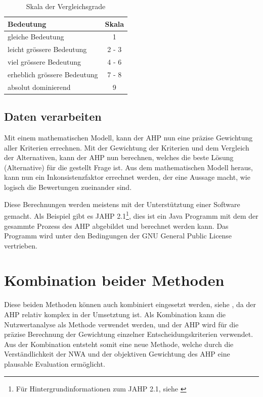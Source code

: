   \begin{table}[ht]
    \sffamily 
    \begin{center}
      \begin{tabular}{lc}
        \toprule
        Bedeutung & Skala\\
        \midrule
        gleiche Bedeutung & 1\\
        leicht grössere Bedeutung & 2 - 3\\
        viel grössere Bedeutung & 4 - 6\\
        erheblich grössere Bedeutung & 7 - 8\\
        absolut dominierend & 9\\
        \bottomrule
      \end{tabular}
      \caption{Skala der Vergleichsgrade}
      \label{tab:vergleichsgrade}
    \end{center}
  \end{table}
    
  \subsection{Daten verarbeiten}
  
  Mit einem mathematischen Modell, kann der \ac{AHP} nun eine präzise Gewichtung
  aller Kriterien errechnen. Mit der Gewichtung der Kriterien und dem Vergleich
  der Alternativen, kann der \ac{AHP} nun berechnen, welches die beste Lösung
  (Alternative) für die gestellt Frage ist. Aus dem mathematischen Modell
  heraus, kann nun ein Inkonsistenzfaktor errechnet werden, der eine Aussage
  macht, wie logisch die Bewertungen zueinander sind.
  
  Diese Berechnungen werden meistens mit der Unterstütztung einer Software
  gemacht. Als Beispiel gibt es JAHP 2.1\footnote{Für Hintergrundinformationen
  zum JAHP 2.1, siehe \cite{JAHP}}, dies ist ein Java Programm mit dem der
  gesammte Prozess des \ac{AHP} abgebildet und berechnet werden kann. Das
  Programm wird unter den Bedingungen der GNU General Public License
  vertrieben.
    
  \section{Kombination beider Methoden}
  
  Diese beiden Methoden können auch kombiniert eingesetzt werden, siehe
  \cite{AhpNwaKombination}, da der \ac{AHP} relativ komplex in der Umsetztung
  ist. Als Kombination kann die Nutzwertanalyse als Methode verwendet werden,
  und der \ac{AHP} wird für die präzise Berechnung der Gewichtung einzelner
  Entscheidungskriterien verwendet. Aus der Kombination entsteht somit eine
  neue Methode, welche durch die Verständlichkeit der \ac{NWA} und der
  objektiven Gewichtung des \ac{AHP} eine plausable Evaluation ermöglicht.
  
